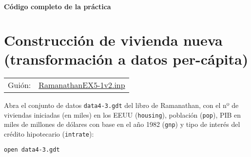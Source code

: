\documentclass[11pt]{article}
\begin{document}
\vspace{10pt}
\noindent
\textbf{Código completo de la práctica}
\vspace{10pt}

\clearpage


\section{Construcción de vivienda nueva (transformación a datos per-cápita)}
\label{sec:org73c5a83}
\begin{center}
\begin{tabular}{ll}
Guión: & \href{https://github.com/mbujosab/Ectr/tree/master/Practicas/Gretl/scripts/RamanathanEX5-1v2.inp}{RamanathanEX5-1v2.inp}\\
\end{tabular}
\end{center}

Abra el conjunto de datos \texttt{data4-3.gdt} del libro de Ramanathan, con
el nº de viviendas iniciadas (en miles) en los EEUU (\texttt{housing}),
población (\texttt{pop}), PIB en miles de millones de dólares con base en el
año 1982 (\texttt{gnp}) y tipo de interés del crédito hipotecario
(\texttt{intrate}):
{\vspace{0pt} \color{gray!70!black}
\begin{verbatim}
open data4-3.gdt
\end{verbatim}
}
\end{document}
